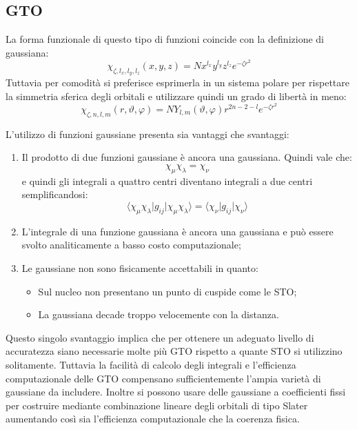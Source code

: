 \documentclass[oneside]{amsbook}
\numberwithin{section}{chapter}
\numberwithin{equation}{section}
\numberwithin{figure}{section}
\begin{document}
\subsection{GTO}
La forma funzionale di questo tipo di funzioni coincide con la definizione di gaussiana:
\begin{equation}
\chi_{\zeta,l_x,l_y,l_z}(x,y,z)= N x^{l_x}y^{l_y}z^{l_z}e^{-\zeta r^2}
\end{equation}
Tuttavia per comodità si preferisce esprimerla in un sistema polare per rispettare la simmetria sferica degli orbitali e utilizzare quindi un grado di libertà in meno:
\begin{equation}
\chi_{\zeta,n,l,m}(r, \vartheta, \varphi)= N Y_{l,m}(\vartheta, \varphi) r^{2n-2-l}e^{-\zeta r^2}
\end{equation}

L'utilizzo di funzioni gaussiane presenta sia vantaggi che svantaggi:
\begin{enumerate}
\item Il prodotto di due funzioni gaussiane è ancora una gaussiana. Quindi vale che:
$$\chi_\mu\chi_\lambda=\chi_\nu$$ e quindi gli integrali a quattro centri diventano integrali a due centri semplificandosi:
$$\langle\chi_\mu\chi_\lambda\vert g_{ij}\vert\chi_\mu\chi_\lambda\rangle=\langle\chi_\nu\vert g_{ij}\vert\chi_\nu\rangle$$
\item L'integrale di una funzione gaussiana è ancora una gaussiana e può essere svolto analiticamente a basso costo computazionale;
\item Le gaussiane non sono fisicamente accettabili in quanto:
\begin{itemize}
\item Sul nucleo non presentano un punto di cuspide come le STO;
\item La gaussiana decade troppo velocemente con la distanza.
\end{itemize}
\end{enumerate}
Questo singolo svantaggio implica che per ottenere un adeguato livello di accuratezza siano necessarie molte più GTO rispetto a quante STO si utilizzino solitamente. Tuttavia la facilità di calcolo degli integrali e l'efficienza computazionale delle GTO compensano sufficientemente l'ampia varietà di gaussiane da includere.
Inoltre si possono usare delle gaussiane a coefficienti fissi per costruire mediante combinazione lineare degli orbitali di tipo Slater aumentando così sia l'efficienza computazionale che la coerenza fisica.
\end{document}
